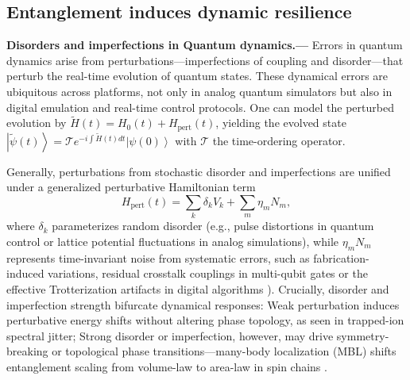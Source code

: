 \documentclass[12pt]{article}
\newcommand{\ket}[1]{\left|#1\right\rangle}
\begin{document}
\subsection*{ Entanglement induces dynamic resilience}


\noindent\textbf{Disorders and imperfections in Quantum dynamics.---}
Errors in quantum dynamics arise from perturbations---imperfections of coupling and disorder---that perturb the real-time evolution of quantum states. These dynamical errors are ubiquitous across platforms, not only in analog quantum simulators but also in digital emulation and real-time control protocols. One can model the perturbed evolution by
   $ \widetilde{H}(t)=H_0(t)+H_{\text{pert}}(t)$, yielding the evolved state 
  $  \ket{\widetilde{\psi}(t)}=\mathcal{T}e^{-i\int \widetilde{H}(t) dt}\ket{\psi(0)}$ with $\mathcal{T}$ the time-ordering operator. 

Generally, perturbations from stochastic disorder and  imperfections  are unified under a generalized perturbative Hamiltonian term
\begin{equation}
   H_{\text{pert}}(t) = \sum_k \delta_k V_k + \sum_m \eta_m N_m,
\end{equation}
where $\delta_k$ parameterizes random disorder (e.g., pulse distortions in quantum control or lattice potential fluctuations in analog simulations), while $\eta_m N_m$ represents time-invariant noise from systematic errors, such as fabrication-induced variations, residual crosstalk couplings in multi-qubit gates \cite{crosstalkPRXQuantum.3.020301} or the effective Trotterization artifacts in digital algorithms \cite{childsTheoryTrotterError2021}). 
Crucially, disorder and imperfection strength bifurcate dynamical responses: Weak perturbation 
induces perturbative energy shifts without altering phase topology, as seen in trapped-ion spectral jitter; Strong disorder or imperfection,
however, may drive symmetry-breaking or topological phase transitions---many-body localization (MBL) shifts entanglement scaling from volume-law to area-law in spin chains \cite{MBLRevModPhys.91.021001}.
\end{document}
